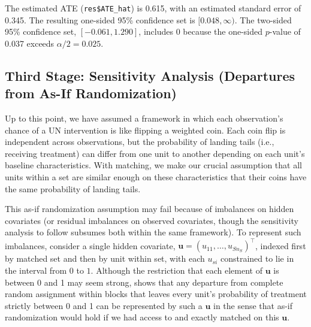\documentclass[
  12pt,
  leqno]{article}
\begin{document}
\doublespacing

The estimated ATE (\texttt{res\$ATE\_hat}) is 0.615, with an estimated
standard error of 0.345. The resulting one-sided 95\% confidence set is
\([0.048, \infty)\). The two-sided 95\% confidence set,
\([-0.061, 1.290]\), includes \(0\) because the one-sided \(p\)-value of
0.037 exceeds \(\alpha/2 = 0.025\).

\subsection{Third Stage: Sensitivity Analysis (Departures from As-If
Randomization)}\label{third-stage-sensitivity-analysis-departures-from-as-if-randomization}

Up to this point, we have assumed a framework in which each
observation's chance of a UN intervention is like flipping a weighted
coin. Each coin flip is independent across observations, but the
probability of landing tails (i.e., receiving treatment) can differ from
one unit to another depending on each unit's baseline characteristics.
With matching, we make our crucial assumption that all units within a
set are similar enough on these characteristics that their coins have
the same probability of landing tails.

This as-if randomization assumption may fail because of imbalances on
hidden covariates (or residual imbalances on observed covariates, though
the sensitivity analysis to follow subsumes both within the same
framework). To represent such imbalances, consider a single hidden
covariate, \(\bm{u} = (u_{11}, \ldots , u_{Sn_S})^{\top}\), indexed
first by matched set and then by unit within set, with each \(u_{si}\)
constrained to lie in the interval from \(0\) to \(1\). Although the
restriction that each element of \(\bm{u}\) is between 0 and 1 may seem
strong, \citet[p.~300, fn. 33]{rosenbaum2017} shows that any departure
from complete random assignment within blocks that leaves every unit's
probability of treatment strictly between 0 and 1 can be represented by
such a \(\bm{u}\) in the sense that as-if randomization would hold if we
had access to and exactly matched on this \(\bm{u}\).
\end{document}
